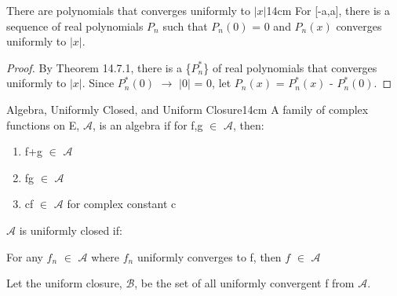    \vspace{0.5cm}



    \begin{corollary}{There are polynomials that converges uniformly to $|x|$}{14cm}
        For [-a,a], there is a sequence of real polynomials $P_n$
        such that $P_n(0)$ = 0 and $P_n(x)$ converges uniformly to $|x|$. 
    \end{corollary}

    \begin{proof}
        By {\color{red} Theorem 14.7.1}, there is a \{$P_n^*$\}
        of real polynomials that converges uniformly to $|x|$.
        Since $P_n^*(0)$ $\rightarrow$ $|0|$ = 0, let
        $P_n(x)$ = $P_n^*(x)$ - $P_n^*(0)$.
    \end{proof}

    \vspace{0.5cm}



    \begin{definition}{Algebra, Uniformly Closed, and Uniform Closure}{14cm}
        A family of complex functions on E, $\mathscr{A}$, is an algebra
        if for f,g $\in$ $\mathscr{A}$, then:

        \begin{enumerate}[label=(\alph*), leftmargin=1.5cm, itemsep=0.1cm]
            \item f+g $\in$ $\mathscr{A}$
            
            \item fg $\in$ $\mathscr{A}$
            
            \item cf $\in$ $\mathscr{A}$ for complex constant c 
        \end{enumerate}

        \vspace{0.3cm}

        $\mathscr{A}$ is uniformly closed if:
        
        \hspace{0.5cm}
        For any $f_n$ $\in$ $\mathscr{A}$
        where $f_n$ uniformly converges to f, then $f$ $\in$ $\mathscr{A}$
        
        \vspace{0.3cm}

        Let the uniform closure, $\mathscr{B}$, be the set of all
        uniformly convergent f from $\mathscr{A}$.
    \end{definition}

